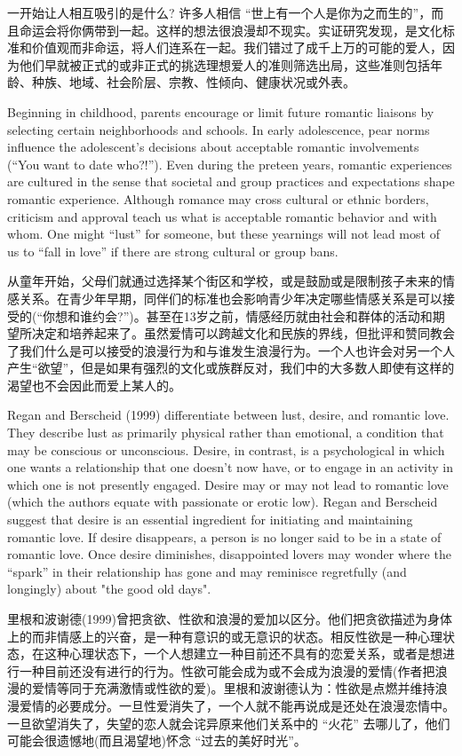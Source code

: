 \documentclass[cs4size, a4paper,12pt]{article}
\newcounter{numpar}
\newcommand*{\newpar}{\numpar{}}
\begin{document}
一开始让人相互吸引的是什么? 许多人相信 ``世上有一个人是你为之而生的''，而且命运会将你俩带到一起。这样的想法很浪漫却不现实。实证研究发现，是文化标准和价值观而非命运，将人们连系在一起。我们错过了成千上万的可能的爱人，因为他们早就被正式的或非正式的挑选理想爱人的准则筛选出局，这些准则包括年龄、种族、地域、社会阶层、宗教、性倾向、健康状况或外表。

 \newpar Beginning in childhood, parents encourage or limit future romantic liaisons by selecting certain neighborhoods and schools. In early adolescence, pear norms influence the adolescent's decisions about acceptable romantic involvements (``You want to date who?!''). Even during the preteen years, romantic experiences are cultured in the sense that societal and group practices and expectations shape romantic experience. Although romance may cross cultural or ethnic borders, criticism and approval teach us what is acceptable romantic behavior and with whom. One might ``lust'' for someone, but these yearnings will not lead most of us to ``fall in love'' if there are strong cultural or group bans.

从童年开始，父母们就通过选择某个街区和学校，或是鼓励或是限制孩子未来的情感关系。在青少年早期，同伴们的标准也会影响青少年决定哪些情感关系是可以接受的(“你想和谁约会?”)。甚至在13岁之前，情感经历就由社会和群体的活动和期望所决定和培养起来了。虽然爱情可以跨越文化和民族的界线，但批评和赞同教会了我们什么是可以接受的浪漫行为和与谁发生浪漫行为。一个人也许会对另一个人产生“欲望”，但是如果有强烈的文化或族群反对，我们中的大多数人即使有这样的渴望也不会因此而爱上某人的。

 \newpar Regan and Berscheid (1999) differentiate between lust, desire, and romantic love.
They describe lust as primarily physical rather than emotional, a condition that may
be conscious or unconscious. Desire, in contrast, is a psychological in which one
wants a relationship that one doesn't now have, or to engage in an activity in which
one is not presently engaged. Desire may or may not lead to romantic love (which
the authors equate with passionate or erotic low). Regan and Berscheid suggest that
desire is an essential ingredient for initiating and maintaining romantic love. If desire
disappears, a person is no longer said to be in a state of romantic love. Once desire
diminishes, disappointed lovers may wonder where the ``spark'' in their relationship has gone and may reminisce regretfully (and longingly) about "the good old days".

里根和波谢德(1999)曾把贪欲、性欲和浪漫的爱加以区分。他们把贪欲描述为身体上的而非情感上的兴奋，是一种有意识的或无意识的状态。相反性欲是一种心理状态，在这种心理状态下，一个人想建立一种目前还不具有的恋爱关系，或者是想进行一种目前还没有进行的行为。性欲可能会成为或不会成为浪漫的爱情(作者把浪漫的爱情等同于充满激情或性欲的爱)。里根和波谢德认为：性欲是点燃并维持浪漫爱情的必要成分。一旦性爱消失了，一个人就不能再说成是还处在浪漫恋情中。一旦欲望消失了，失望的恋人就会诧异原来他们关系中的 ``火花'' 去哪儿了，他们可能会很遗憾地(而且渴望地)怀念 ``过去的美好时光''。
\end{document}

